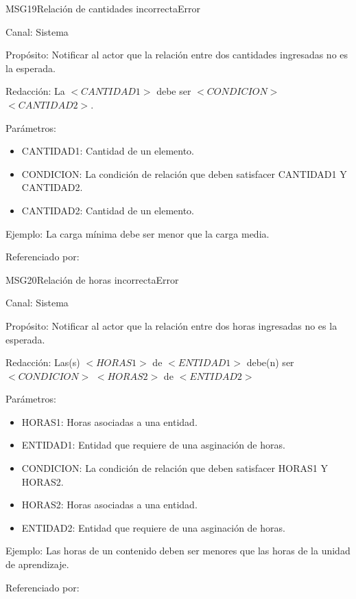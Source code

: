 \begin{mensaje}{MSG19}{Relación de cantidades incorrecta}{Error}
	\item[Canal:] Sistema
	\item[Propósito:] Notificar al actor que la relación entre dos cantidades ingresadas no es la esperada.
	\item[Redacción:] La $<CANTIDAD1>$ debe ser $<CONDICION>$ $<CANTIDAD2>$.
	\item[Parámetros:] 
	\begin{itemize}
		\item CANTIDAD1: Cantidad de un elemento.
		\item CONDICION: La condición de relación que deben satisfacer CANTIDAD1 Y CANTIDAD2.
		\item CANTIDAD2: Cantidad de un elemento.
	\end{itemize}
	\item[Ejemplo:] La carga mínima debe ser menor que la carga media.
	\item[Referenciado por: ] 
\end{mensaje}

\begin{mensaje}{MSG20}{Relación de horas incorrecta}{Error}
	\item[Canal:] Sistema
	\item[Propósito:] Notificar al actor que la relación entre dos horas ingresadas no es la esperada.
	\item[Redacción:] Las(s) $<HORAS1>$ de $<ENTIDAD1>$ debe(n) ser $<CONDICION>$ $<HORAS2>$ de $<ENTIDAD2>$
	\item[Parámetros:] 
	\begin{itemize}
		\item HORAS1: Horas asociadas a una entidad.
		\item ENTIDAD1: Entidad que requiere de una asginación de horas.
		\item CONDICION: La condición de relación que deben satisfacer HORAS1 Y HORAS2.
		\item HORAS2: Horas asociadas a una entidad.
		\item ENTIDAD2: Entidad que requiere de una asginación de horas.
	\end{itemize}
	\item[Ejemplo:] Las horas de un contenido deben ser menores que las horas de la unidad de aprendizaje.
	\item[Referenciado por: ] 
\end{mensaje}


